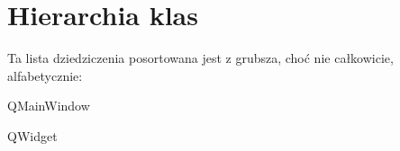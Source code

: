 \section{Hierarchia klas}
Ta lista dziedziczenia posortowana jest z grubsza, choć nie całkowicie, alfabetycznie\-:\begin{DoxyCompactList}
\item {}
\item {}
\item Q\-Main\-Window\begin{DoxyCompactList}
\item {}
\end{DoxyCompactList}
\item Q\-Widget\begin{DoxyCompactList}
\item {}
\end{DoxyCompactList}
\item {}
\end{DoxyCompactList}
